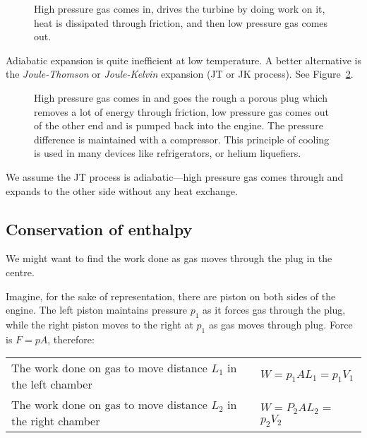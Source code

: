 \documentclass[12pt,chapterprefix=false,dvipsnames]{scrbook}
\theoremstyle{dotless}
\theoremstyle{definition}
\begin{document}
\begin{figure}[htpb]
	\centering
	
	\caption{High pressure gas comes in, drives the turbine by doing work on it, heat is dissipated through friction, and then low pressure gas comes out.}%
	\label{fig:turbine_cool_gas}
\end{figure}

Adiabatic expansion is quite inefficient at low temperature. A
better alternative is the \textit{Joule-Thomson} or
\textit{Joule-Kelvin} expansion (JT or JK process). See
Figure~\ref{fig:joule_thomson_expansion}.

\begin{figure}[htpb]
	\centering
	
	\caption{High pressure gas comes in and goes the rough a porous plug
		which removes a lot of energy through
		friction, low pressure gas comes out of the other end and is pumped back
		into the engine. The pressure difference is maintained with a
		compressor. This principle of cooling is used in many devices
		like refrigerators, or helium liquefiers.}%
	\label{fig:joule_thomson_expansion}
\end{figure}

We assume the JT process is adiabatic---high pressure gas comes
through and expands to the other side without any heat exchange.

\subsection{Conservation of enthalpy}%
\label{sub:conservation_of_enthalpy}

We might want to find the work done as gas moves through the
plug in the centre.

Imagine, for the sake of representation, there are piston on
both sides of the engine. The left piston maintains pressure
$p_1$ as it forces gas through the plug, while
the right piston moves to the right at $p_1$
as gas moves through plug. Force is $F = pA$,
therefore:

\begin{tabular}{l l}
	The work done on gas to move distance $L_1$ in the left chamber  & $W = p_1 A L_1 = p_1 V_1$   \\
	The work done on gas to move distance $L_2$ in the right chamber & $W = P_2 A L_2$ = $p_2 V_2$ \\
\end{tabular}\\
\end{document}
